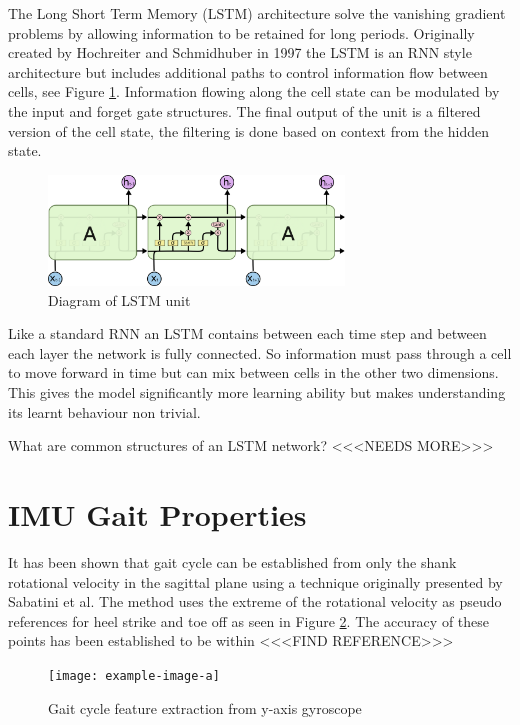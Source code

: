 \documentclass[sensors,article,submit,moreauthors,pdftex]{Definitions/mdpi}
\begin{document}
The Long Short Term Memory (LSTM) architecture solve the vanishing gradient problems by allowing information to be retained for long periods. Originally created by Hochreiter and Schmidhuber in 1997\cite{Hochreiter1997} the LSTM is an RNN style architecture but includes additional paths to control information flow between cells, see Figure \ref{fig:lstm_unit}. Information flowing along the cell state can be modulated by the input and forget gate structures. The final output of the unit is a filtered version of the cell state, the filtering is done based on context from the hidden state.\cite{Olah2015}   %
\begin{figure}[!htb]
    \centering
    \includegraphics[width=0.7\textwidth]{Figures/lstm/LSTM-chain.png}
    \caption{Diagram of LSTM unit \cite{Olah2015}}
    \label{fig:lstm_unit}
\end{figure}

Like a standard RNN an LSTM contains between each time step and between each layer the network is fully connected. So information must pass through a cell to move forward in time but can mix between cells in the other two dimensions. This gives the model significantly more learning ability but makes understanding its learnt behaviour non trivial.

What are common structures of an LSTM network? <<<NEEDS MORE>>>

\section{IMU Gait Properties}
It has been shown that gait cycle can be established from only the shank rotational velocity in the sagittal plane using a technique originally presented by Sabatini et al\cite{Sabatini2005}. The method uses the extreme of the rotational velocity as pseudo references for heel strike and toe off as seen in Figure \ref{fig:y-gyro-hs-to}. The accuracy of these points has been established to be within <<<FIND REFERENCE>>>

\begin{figure}[!htb]
    \centering
    \texttt{[image: example-image-a]}
    \caption{Gait cycle feature extraction from y-axis gyroscope}
    \label{fig:y-gyro-hs-to}
\end{figure}
\end{document}
